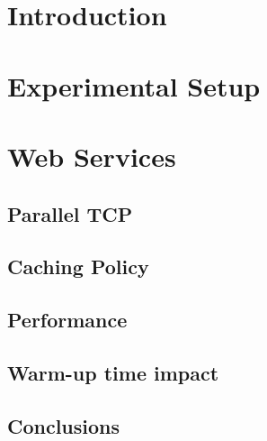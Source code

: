 \documentclass[a4paper,10pt]{article}
\begin{document}
\thispagestyle{empty}
\newpage
\begin{multicols}{2}
\clearpage
\setcounter{page}{1}



\section{Introduction}

\section{Experimental Setup}
\label{sec:experimental_setup}



\section{Web Services}

\subsection{Parallel TCP}

\subsection{Caching Policy}

\subsection{Performance}

\subsection{Warm-up time impact}

\subsection{Conclusions}



\end{multicols}
\appendix


\begin{multicols}{2}









\end{multicols}

%
%
\end{document}
